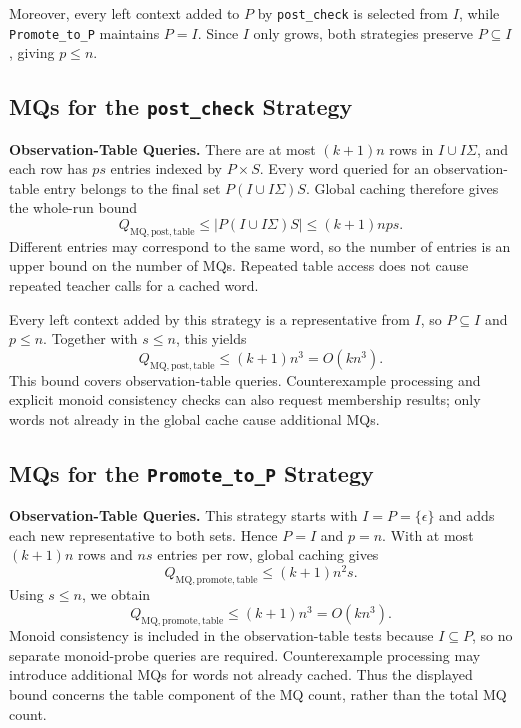\documentclass{ieice-tecrep}
\begin{document}
Moreover, every left context added to \(P\) by \texttt{post\_check}
is selected from \(I\), while \texttt{Promote\_to\_P} maintains
\(P=I\). Since \(I\) only grows, both strategies preserve
\(P\subseteq I\), giving \(p\le n\).
\subsection{MQs for the \texttt{post\_check} Strategy}\label{complexity-post-check}

\textbf{Observation-Table Queries.}
There are at most \((k+1)n\) rows in \(I\cup I\Sigma\), and each
row has \(ps\) entries indexed by \(P\times S\). Every word queried
for an observation-table entry belongs to the final set
\(P(I\cup I\Sigma)S\). Global caching therefore gives the whole-run
bound
\[
Q_{\mathrm{MQ},\mathrm{post},\mathrm{table}}
\le |P(I\cup I\Sigma)S|
\le (k+1)nps.
\]
Different entries may correspond to the same word, so the number of
entries is an upper bound on the number of MQs. Repeated table access
does not cause repeated teacher calls for a cached word.

Every left context added by this strategy is a representative from
\(I\), so \(P\subseteq I\) and \(p\le n\). Together with \(s\le n\),
this yields
\[
Q_{\mathrm{MQ},\mathrm{post},\mathrm{table}}\le(k+1)n^3=O(kn^3).
\]
This bound covers observation-table queries. Counterexample processing
and explicit monoid consistency checks can also request membership
results; only words not already in the global cache cause additional
MQs.

\subsection{MQs for the \texttt{Promote\_to\_P} Strategy}\label{complexity-promote-to-p}

\textbf{Observation-Table Queries.}
This strategy starts with \(I=P=\{\epsilon\}\) and adds each new
representative to both sets. Hence \(P=I\) and \(p=n\). With at most
\((k+1)n\) rows and \(ns\) entries per row, global caching gives
\[
Q_{\mathrm{MQ},\mathrm{promote},\mathrm{table}}\le(k+1)n^2s.
\]
Using \(s\le n\), we obtain
\[
Q_{\mathrm{MQ},\mathrm{promote},\mathrm{table}}\le(k+1)n^3=O(kn^3).
\]
Monoid consistency is included in the observation-table tests because
\(I\subseteq P\), so no separate monoid-probe queries are required.
Counterexample processing may introduce additional MQs for words not
already cached. Thus the displayed bound concerns the table component
of the MQ count, rather than the total MQ count.
\end{document}
